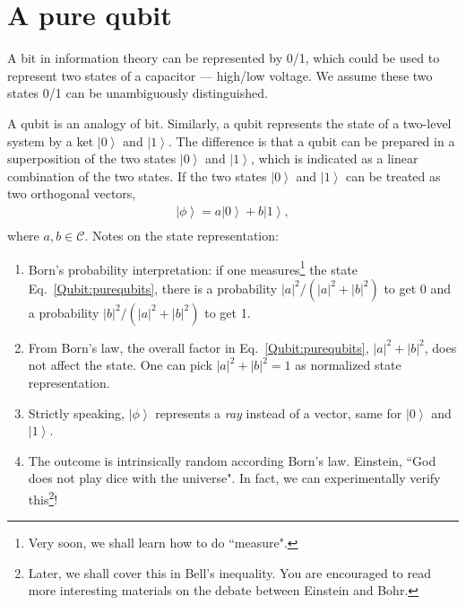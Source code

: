 \documentclass[onecolumn,pra,superscriptaddress,nofootinbib]{revtex4-1}
\newcommand{\ket}[1]{\mbox{$\left| #1 \right\rangle$}}
\begin{document}
\section{A pure qubit}
A bit in information theory can be represented by 0/1, which could be used to represent two states of a capacitor --- high/low voltage. We assume these two states 0/1 can be unambiguously distinguished.

A qubit is an analogy of bit. Similarly, a qubit represents the state of a two-level system  by a ket $\ket{0}$ and $\ket{1}$. The difference is that a qubit can be prepared in a superposition of the two states $\ket{0}$ and $\ket{1}$, which is indicated as a linear combination of the two states. If the two states $\ket{0}$ and $\ket{1}$ can be treated as two orthogonal vectors,
\begin{equation} \label{Qubit:purequbits}
\begin{aligned}
\ket{\phi}=a\ket{0}+b\ket{1},\\
\end{aligned}
\end{equation}
where $a,b\in \mathcal{C}$. Notes on the state representation:
\begin{enumerate}
\item
Born's probability interpretation: if one measures\footnote{Very soon, we shall learn how to do ``measure".} the state Eq.~\eqref{Qubit:purequbits}, there is a probability $|a|^2/(|a|^2+|b|^2)$ to get 0 and a probability $|b|^2/(|a|^2+|b|^2)$ to get 1.

\item
From Born's law, the overall factor in Eq.~\eqref{Qubit:purequbits}, $|a|^2+|b|^2$, does not affect the state. One can pick $|a|^2+|b|^2=1$ as normalized state representation.

\item
Strictly speaking, $\ket{\phi}$ represents a \emph{ray} instead of a vector, same for $\ket{0}$ and $\ket{1}$.

\item
The outcome is intrinsically random according Born's law. Einstein, ``God does not play dice with the universe". In fact, we can experimentally verify this\footnote{Later, we shall cover this in Bell's inequality. You are encouraged to read more interesting materials on the debate between Einstein and Bohr.}!
\end{enumerate}
\end{document}
